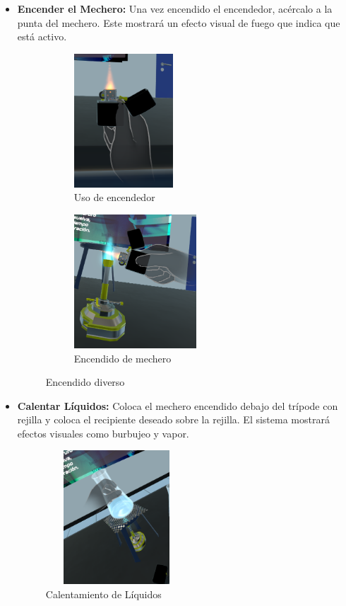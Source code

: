\begin{itemize}
    \item \textbf{Encender el Mechero:}  
    Una vez encendido el encendedor, acércalo a la punta del mechero. Este mostrará un efecto visual de fuego que indica que está activo.

\begin{figure}[thbp]
    \centering
    \begin{subfigure}[b]{0.4\linewidth}
        \includegraphics[width=\linewidth, height = 5cm]{img/Interacciones/Encendido01.png}
        \caption{Uso de encendedor}
        \label{fig:Encendedor}
    \end{subfigure}
    \begin{subfigure}[b]{0.4\linewidth}
        \includegraphics[width=\linewidth, height = 5cm]{img/Interacciones/Encendido02.png}
        \caption{Encendido de mechero}
        \label{fig:Mechero}
    \end{subfigure}
    \caption{Encendido diverso}
\end{figure}

    \item \textbf{Calentar Líquidos:}  
    Coloca el mechero encendido debajo del trípode con rejilla y coloca el recipiente deseado sobre la rejilla. El sistema mostrará efectos visuales como burbujeo y vapor.
    \begin{figure}[thbp]
        \centering
        \includegraphics[width=0.5\textwidth, height = 5cm]{img/Interacciones/Calentamiento.png}
        \caption{Calentamiento de Líquidos}
        \label{fig:Calentamiento de Líquidos}
    \end{figure}
\end{itemize}
\newpage
